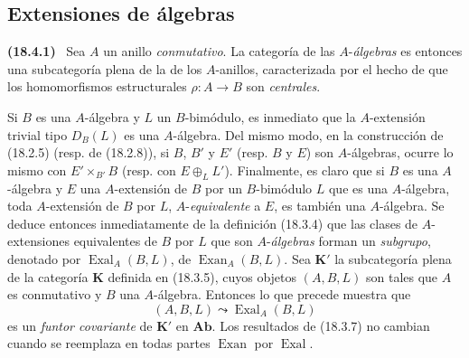 \documentclass[10pt,oneside]{book}
\makeatletter
\newcommand{\setmanualcurrentlabel}[1]{\def\@currentlabel{#1}}
\newenvironment{env}[1][]{\setmanualcurrentlabel{#1}\par\medskip\noindent\textbf{(#1)}\ }{\par}
\makeatother
\begin{document}
\subsection{Extensiones de álgebras}
\label{subsection:0.18.4-es}

\begin{env}[18.4.1]
\label{0.18.4.1-es}
Sea $A$ un anillo \emph{conmutativo}. La categoría de las $A$-\emph{álgebras} es
entonces una subcategoría plena de la de los $A$-anillos, caracterizada por el
hecho de que los homomorfismos estructurales $\rho:A\to B$ son \emph{centrales}.

Si $B$ es una $A$-álgebra y $L$ un $B$-bimódulo, es inmediato que la
$A$-extensión trivial tipo $D_B(L)$ es una $A$-álgebra. Del mismo modo, en la
construcción de (18.2.5) (resp. de (18.2.8)), si $B$, $B'$ y $E'$ (resp.
$B$ y $E$) son $A$-álgebras, ocurre lo mismo con
$E'\times_{B'}B$ (resp. con $E\oplus_LL'$). Finalmente, es claro que si $B$ es
una $A$-álgebra y $E$ una $A$-extensión de $B$ por un $B$-bimódulo $L$ que
es una $A$-álgebra, toda $A$-extensión de $B$ por $L$, $A$-\emph{equivalente}
a $E$, es también una $A$-álgebra. Se deduce entonces inmediatamente de la definición
(18.3.4) que las clases de $A$-extensiones equivalentes de $B$ por $L$ que
son $A$-\emph{álgebras} forman un \emph{subgrupo}, denotado por
$\operatorname{Exal}_A(B,L)$, de $\operatorname{Exan}_A(B,L)$. Sea
$\boldsymbol{K}'$ la subcategoría plena de la categoría $\boldsymbol{K}$ definida en
(18.3.5), cuyos objetos $(A,B,L)$ son tales que $A$ es conmutativo y $B$
una $A$-álgebra. Entonces lo que precede muestra que
\[
  (A,B,L)\leadsto\operatorname{Exal}_A(B,L)
\]
es un \emph{funtor covariante} de $\boldsymbol{K}'$ en $\boldsymbol{Ab}$. Los
resultados de (18.3.7) no cambian cuando se reemplaza en todas partes
$\operatorname{Exan}$ por $\operatorname{Exal}$.
\end{env}
\end{document}

